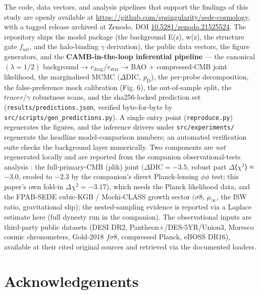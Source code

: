 \documentclass[preprint,12pt]{elsarticle}
\begin{document}
The code, data vectors, and analysis pipelines that support the findings
of this study are openly available at
\url{https://github.com/spsingularity/sede-cosmology}, with a tagged
release archived at Zenodo, DOI
\href{https://doi.org/10.5281/zenodo.21525524}{10.5281/zenodo.21525524}.
The repository ships the model package (the background E(z), w(z), the
structure gate \(f_{\mathrm{sat}}\), and the halo-binding \(\gamma\)
derivation), the public data vectors, the figure generators, and the
\textbf{CAMB-in-the-loop inferential pipeline} --- the canonical
\((\lambda  = 1/2)\) background →
\(r_{\mathrm{drag}}/r_{\mathrm{star}}\) → BAO + compressed-CMB joint
likelihood, the marginalised MCMC \((\Delta \mathrm{DIC}\),
\(p_{\mathrm{D}}\)), the per-probe decomposition, the false-preference
mock calibration (Fig. 6), the out-of-sample split, the
\(tracer/\gamma\) robustness scans, and the sha256-locked prediction set
(\texttt{results/\allowbreak predictions.\allowbreak json}, verified byte-for-byte by
\texttt{src/\allowbreak scripts/\allowbreak gen\_\allowbreak predictions.\allowbreak py}). A single entry point
(\texttt{reproduce.\allowbreak py}) regenerates the figures, and the inference
drivers under \texttt{src/\allowbreak experiments/\allowbreak } regenerate the headline
model-comparison numbers; an automated verification suite checks the
background layer numerically. Two components are \emph{not} regenerated
locally and are reported from the companion observational-tests analysis
\citep{Pandev:2026obstest}: the full-primary-CMB (plik) joint
\((\Delta \mathrm{DIC} = -3.5\), robust part \(\Delta\)⟨\(\chi ^{2}\)⟩ ≈
−3.0, eroded to \(-2.3\) by the companion's direct Planck-lensing
\(\phi \phi\) test; this paper's own fold-in
\(\Delta \chi ^{2} = -3.17\)), which needs the Planck likelihood data,
and the FPAB-SEDE cubic-KGB / Mochi-CLASS growth sector \((\sigma 8\),
\(\mu _\infty\), the ISW ratio, gravitational slip); the nested-sampling
evidence is reported via a Laplace estimate here (full dynesty run in
the companion). The observational inputs are third-party public datasets
(DESI DR2, Pantheon+/DES-5YR/Union3, Moresco cosmic chronometers,
Gold-2018 \(f\sigma 8\), compressed Planck, eBOSS DR16), available at
their cited original sources and retrieved via the documented loaders.

\section*{Acknowledgements}\label{acknowledgements}
\end{document}
